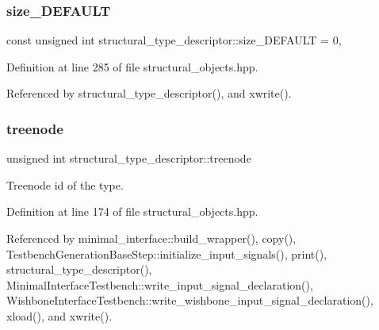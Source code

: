 \subsubsection{\texorpdfstring{size\+\_\+\+D\+E\+F\+A\+U\+LT}{size\_DEFAULT}}
{\footnotesize\ttfamily const unsigned int structural\+\_\+type\+\_\+descriptor\+::size\+\_\+\+D\+E\+F\+A\+U\+LT = 0\hspace{0.3cm}{\ttfamily [static]}, {\ttfamily [private]}}



Definition at line 285 of file structural\+\_\+objects.\+hpp.



Referenced by structural\+\_\+type\+\_\+descriptor(), and xwrite().

\mbox{\label{structstructural__type__descriptor_a56d70456343951df87db074dbe969f87}} 
\subsubsection{\texorpdfstring{treenode}{treenode}}
{\footnotesize\ttfamily unsigned int structural\+\_\+type\+\_\+descriptor\+::treenode}



Treenode id of the type. 



Definition at line 174 of file structural\+\_\+objects.\+hpp.



Referenced by minimal\+\_\+interface\+::build\+\_\+wrapper(), copy(), Testbench\+Generation\+Base\+Step\+::initialize\+\_\+input\+\_\+signals(), print(), structural\+\_\+type\+\_\+descriptor(), Minimal\+Interface\+Testbench\+::write\+\_\+input\+\_\+signal\+\_\+declaration(), Wishbone\+Interface\+Testbench\+::write\+\_\+wishbone\+\_\+input\+\_\+signal\+\_\+declaration(), xload(), and xwrite().

\mbox{\label{structstructural__type__descriptor_ae75ae7cc8308c33891ef7896e74ea169}} 
